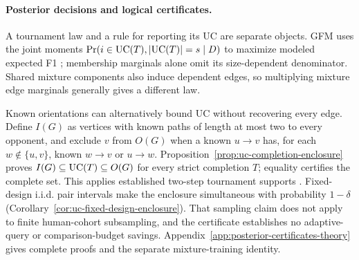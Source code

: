 \paragraph{Posterior decisions and logical certificates.}
A tournament law and a rule for reporting its UC are separate objects. GFM uses the joint moments $\Pr(i\in\mathrm{UC}(T),|\mathrm{UC}(T)|=s\mid D)$ to maximize modeled expected F1 \citep{waegeman2014fmeasure}; membership marginals alone omit its size-dependent denominator. Shared mixture components also induce dependent edges, so multiplying mixture edge marginals generally gives a different law.

Known orientations can alternatively bound UC without recovering every edge. Define $I(G)$ as vertices with known paths of length at most two to every opponent, and exclude $v$ from $O(G)$ when a known $u\to v$ has, for each $w\notin\{u,v\}$, known $w\to v$ or $u\to w$. Proposition~\ref{prop:uc-completion-enclosure} proves $I(G)\subseteq\mathrm{UC}(T)\subseteq O(G)$ for every strict completion $T$; equality certifies the complete set. This applies established two-step tournament supports \citep{aziz2015partial,contet2026supports}. Fixed-design i.i.d. pair intervals make the enclosure simultaneous with probability $1-\delta$ (Corollary~\ref{cor:uc-fixed-design-enclosure}). That sampling claim does not apply to finite human-cohort subsampling, and the certificate establishes no adaptive-query or comparison-budget savings. Appendix~\ref{app:posterior-certificates-theory} gives complete proofs and the separate mixture-training identity.
